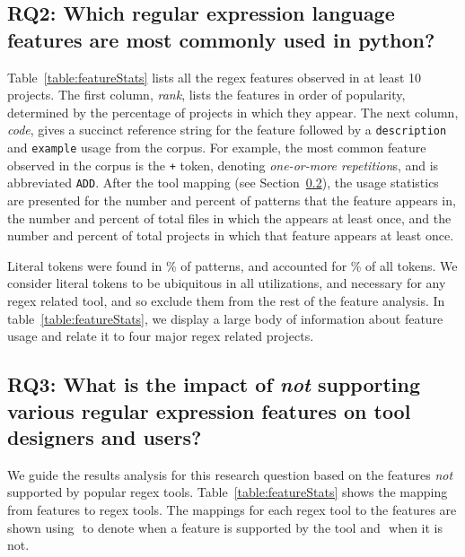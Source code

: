
\subsection{RQ2: Which regular expression language features are most commonly used in python?}
Table~\ref{table:featureStats}  lists all the regex features observed in at least 10 projects.
The first column, \emph{rank}, lists the features in order of popularity, determined by the percentage of projects in which they appear. The next column, \emph{code}, gives a succinct reference string for the feature followed by a {\tt description} and {\tt example} usage from the corpus. For example, the most common feature observed in the corpus is the {\tt +} token, denoting \emph{one-or-more repetition}s, and is abbreviated {\tt ADD}.
After the tool mapping (see Section~\ref{results:rq3}), the usage statistics are presented for the number and percent of patterns that the feature appears in, the number and percent of total files in which the appears at least once, and the number and percent of total projects in which that feature appears at least once.

Literal tokens were found in \% of patterns, and accounted for \% of all tokens.  We consider literal tokens to be ubiquitous in all utilizations, and necessary for any regex related tool, and so exclude them from the rest of the feature analysis.  In table~\ref{table:featureStats}, we display a large body of information about feature usage and relate it to four major regex related projects. 




	\subsection{{RQ3:} What is the impact of \emph{not} supporting various regular expression features on tool designers and users?}
	\label{results:rq3}

We guide the results analysis for this research question based on the features \emph{not} supported by popular regex tools.
Table~\ref{table:featureStats} shows the mapping from features to regex tools.
The mappings for each regex tool to the features are shown using \yes $ $ to denote when
a feature is supported by the tool and \no $ $ when it is not.




